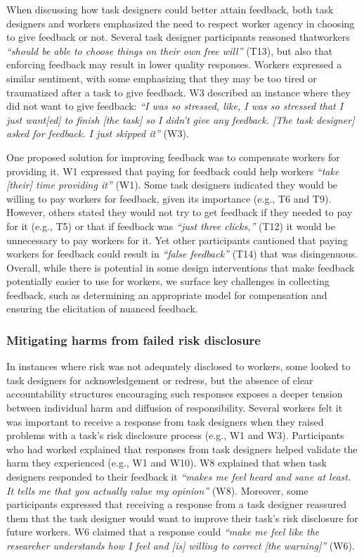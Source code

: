 When discussing how task designers could better attain feedback, both task designers and workers emphasized the need to respect worker agency in choosing to give feedback or not. Several task designer participants reasoned thatworkers \textit{``should be able to choose things on their own free will''} (T13), but also that enforcing feedback may result in lower quality responses. Workers expressed a similar sentiment, with some emphasizing that they may be too tired or traumatized after a task to give feedback. W3 described an instance where they did not want to give feedback: \textit{``I was so stressed, like, I was so stressed that I just want[ed] to finish [the task] so I didn't give any feedback. [The task designer] asked for feedback. I just skipped it''} (W3). 

One proposed solution for improving feedback was to compensate workers for providing it. W1 expressed that paying for feedback could help workers \textit{``take [their] time providing it''} (W1). Some task designers indicated they would be willing to pay workers for feedback, given its importance (e.g., T6 and T9). However, others stated they would not try to get feedback if they needed to pay for it (e.g., T5) or that if feedback was \textit{``just three clicks,''} (T12) it would be unnecessary to pay workers for it. Yet other participants cautioned that paying workers for feedback could result in \textit{``false feedback''} (T14) that was disingenuous. Overall, while there is potential in some design interventions that make feedback potentially easier to use for workers, we surface key challenges in collecting feedback, such as determining an appropriate model for compensation and ensuring the elicitation of nuanced feedback. 


\subsubsection{Mitigating harms from failed risk disclosure}
In instances where risk was not adequately disclosed to workers, some looked to task designers for acknowledgement or redress, but the absence of clear accountability structures encouraging such responses exposes a deeper tension between individual harm and diffusion of responsibility. Several workers felt it was important to receive a response from task designers when they raised problems with a task's  risk disclosure process (e.g., W1 and W3). Participants who had worked explained that responses from task designers helped validate the harm they experienced (e.g., W1 and W10). W8 explained that when task designers responded to their feedback it \textit{``makes me feel heard and sane at least. It tells me that you actually value my opinion''} (W8). Moreover, some participants expressed that receiving a response from a task designer reassured them that the task designer would want to improve their task's risk disclosure for future workers. W6 claimed that a response could \textit{``make me feel like the researcher understands how I feel and [is] willing to correct [the warning]''} (W6). 

